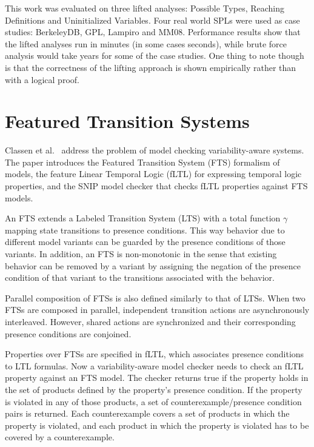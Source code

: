 \documentclass[11pt]{article}
\begin{document}
This work was evaluated on three lifted analyses: Possible Types, Reaching Definitions and Uninitialized Variables. Four real world SPLs were used as case studies: BerkeleyDB, GPL, Lampiro and MM08. Performance results show that the lifted analyses run in minutes (in some cases seconds), while brute force analysis would take years for some of the case studies. One thing to note though is that the correctness of the lifting approach is shown empirically rather than with a logical proof.

\section{Featured Transition Systems}

Classen et al.~\cite{Classen:2013} address the problem of model checking variability-aware systems. The paper introduces the Featured Transition System (FTS) formalism of models, the feature Linear Temporal Logic (fLTL) for expressing temporal logic properties, and the SNIP model checker that checks fLTL properties against FTS models.

An FTS extends a Labeled Transition System (LTS) with a total function $\gamma$ mapping state transitions to presence conditions. This way behavior due to different model variants can be guarded by the presence conditions of those variants. In addition, an FTS is non-monotonic in the sense that existing behavior can be removed by a variant by assigning the negation of the presence condition of that variant to the transitions associated with the behavior.

Parallel composition of FTSs is also defined similarly to that of LTSs. When two FTSs are composed in parallel, independent transition actions are asynchronously interleaved. However, shared actions are synchronized and their corresponding presence conditions are conjoined. 

Properties over FTSs are specified in fLTL, which associates presence conditions to LTL formulas. Now a variability-aware model checker needs to check an fLTL property against an FTS model. The checker returns true if the property holds in the set of products defined by the property's presence condition. If the property is violated in any of those products, a set of counterexample/presence condition pairs is returned. Each counterexample covers a set of products in which the property is violated, and each product in which the property is violated  has to be covered by a counterexample.
\end{document}
